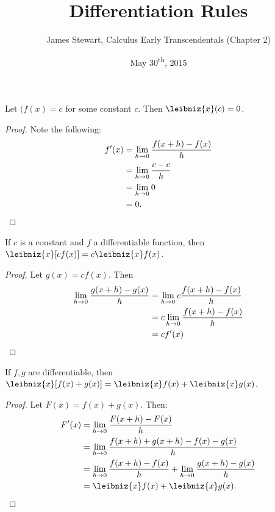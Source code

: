 \documentclass[a4paper,11pt]{article}
\title{Differentiation Rules}
\author{James Stewart, Calculus Early Transcendentals (Chapter 2)}
\date{May 30\textsuperscript{th}, 2015}
\begin{document}
\maketitle
{}

\begin{outline}

    Let \((f(x)=c\) for some constant \(c\). Then \(\leibniz{x}(c) = 0\).
    
    \begin{proof}
      Note the following:
      \begin{align*}
        f'(x) &= \lim\limits_{h\rightarrow 0^{}}\frac{f(x+h)-f(x)}{h}\\
              &= \lim\limits_{h\rightarrow 0^{}}\frac{c-c}{h}        \\
              &= \lim\limits_{h\rightarrow 0^{}}0                    \\
              &= 0\text{.}
      \end{align*}
    \end{proof}
    
    If \(c\) is a constant and \(f\) a differentiable function, then \(\leibniz{x}[cf(x)] = c\leibniz{x}f(x)\).
    
    \begin{proof}
      Let \(g(x) = cf(x)\). Then 
      \begin{align*}
        \lim\limits_{h\rightarrow 0^{}} \frac{g(x+h)-g(x)}{h} &= \lim\limits_{h\rightarrow 0^{}} c\frac{f(x+h)-f(x)}{h}\\
                                            &= c \lim\limits_{h\rightarrow 0^{}}\frac{f(x+h)-f(x)}{h}\\
                                            &= cf'(x)
      \end{align*}
    \end{proof}
    
    If \(f, g\) are differentiable, then \(\leibniz{x}[f(x)+g(x)] = \leibniz{x}f(x) + \leibniz{x}g(x)\).
    
    \begin{proof}
      Let \(F(x) = f(x) + g(x)\). Then:
      \begin{align*}
        F'(x) &= \xlimit{h}{0}\frac{F(x+h)-F(x)}{h}\\
              &= \xlimit{h}{0}\frac{f(x+h)+g(x+h)-f(x)-g(x)}{h}\\
              &= \xlimit{h}{0}\frac{f(x+h)-f(x)}{h} + \xlimit{h}{0}\frac{g(x+h)-g(x)}{h}\\
              &= \leibniz{x}f(x) + \leibniz{x}g(x)\text{.}
      \end{align*}
    \end{proof}
    

\end{outline}
\end{document}
